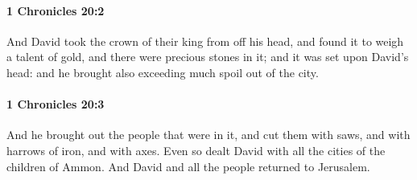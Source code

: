 		\paragraph{1 Chronicles 20:2} %
			\label{1CHRONICLES-20-2}

			And David took the crown of their king from off his head, and found it to weigh a talent of gold, and there were precious stones in it; and it was set upon David’s head: and he brought also exceeding much spoil out of the city.


		\paragraph{1 Chronicles 20:3} %
			\label{1CHRONICLES-20-3}

			And he brought out the people that were in it, and cut them with saws, and with harrows of iron, and with axes. Even so dealt David with all the cities of the children of Ammon. And David and all the people returned to Jerusalem.

